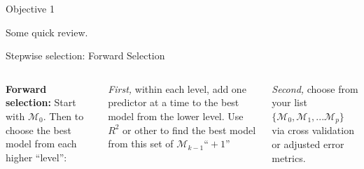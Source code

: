 \documentclass[mathserif, aspectratio=169]{beamer}
\begin{document}
\begin{frame}{Objective 1}

Some quick review.

\end{frame}

\begin{frame}{Stepwise selection: Forward Selection}

\begin{columns}

\textbf{Forward selection:} Start with $\mathcal{M}_0$.  Then to choose the best model from each higher ``level'':

\vspace{5mm}
\textit{First, }within each level, add one predictor at a time to the best model from the lower level.  Use $R^2$ or other to find the best model from this set of $\mathcal{M}_{k-1} \text{``}+ 1\text{''}$

\vspace{5mm}

\textit{Second,} choose from your list $\{\mathcal{M}_0, \mathcal{M}_1,...\mathcal{M}_{p}\}$ via cross validation or adjusted error metrics.\\~\\



\end{columns}
\end{frame}
\end{document}
